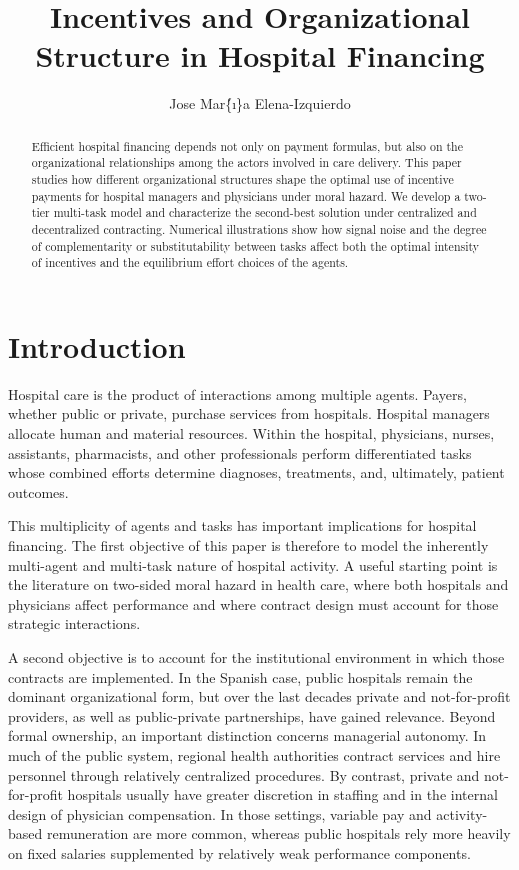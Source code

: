 ﻿\documentclass[12pt,letterpaper]{article}
\title{\textbf{Incentives and Organizational Structure in Hospital Financing}}
\author{Jose Mar\'\{\i\}a Elena-Izquierdo}
\date{}
\begin{document}
\maketitle

\begin{abstract}
Efficient hospital financing depends not only on payment formulas, but also on the organizational relationships among the actors involved in care delivery. This paper studies how different organizational structures shape the optimal use of incentive payments for hospital managers and physicians under moral hazard. We develop a two-tier multi-task model and characterize the second-best solution under centralized and decentralized contracting. Numerical illustrations show how signal noise and the degree of complementarity or substitutability between tasks affect both the optimal intensity of incentives and the equilibrium effort choices of the agents.
\end{abstract}

\section*{Introduction}
Hospital care is the product of interactions among multiple agents. Payers, whether public or private, purchase services from hospitals. Hospital managers allocate human and material resources. Within the hospital, physicians, nurses, assistants, pharmacists, and other professionals perform differentiated tasks whose combined efforts determine diagnoses, treatments, and, ultimately, patient outcomes.

This multiplicity of agents and tasks has important implications for hospital financing. The first objective of this paper is therefore to model the inherently multi-agent and multi-task nature of hospital activity. A useful starting point is the literature on two-sided moral hazard in health care, where both hospitals and physicians affect performance and where contract design must account for those strategic interactions.

A second objective is to account for the institutional environment in which those contracts are implemented. In the Spanish case, public hospitals remain the dominant organizational form, but over the last decades private and not-for-profit providers, as well as public-private partnerships, have gained relevance. Beyond formal ownership, an important distinction concerns managerial autonomy. In much of the public system, regional health authorities contract services and hire personnel through relatively centralized procedures. By contrast, private and not-for-profit hospitals usually have greater discretion in staffing and in the internal design of physician compensation. In those settings, variable pay and activity-based remuneration are more common, whereas public hospitals rely more heavily on fixed salaries supplemented by relatively weak performance components.
\end{document}
